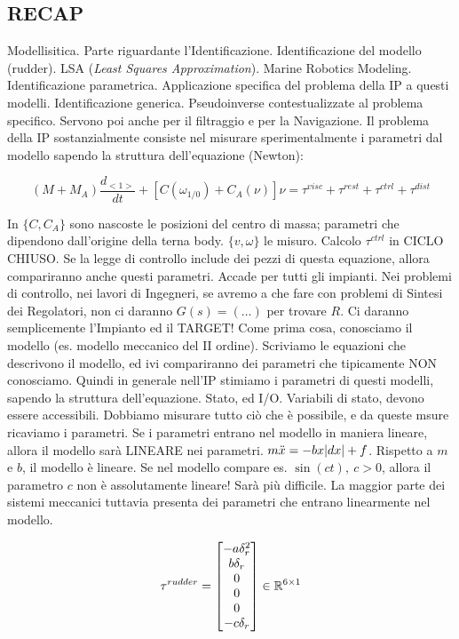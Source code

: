 \subsection{RECAP}

Modellisitica. Parte riguardante l'Identificazione. Identificazione del modello (rudder). LSA (\textit{Least Squares Approximation}). Marine Robotics Modeling. Identificazione parametrica. Applicazione specifica del problema della IP a questi modelli. Identificazione generica. Pseudoinverse contestualizzate al problema specifico. Servono poi anche per il filtraggio e per la Navigazione. Il problema della IP sostanzialmente consiste nel misurare sperimentalmente i parametri dal modello sapendo la struttura dell'equazione (Newton):

\[
	(M+M_A)\frac{d_{<1>}}{dt} + [C(\omega_{1/0}) + C_A(\nu)]\nu = \tau^{visc} + \tau^{rest} + \tau^{ctrl} + \tau^{dist}
\]

In $\{C,C_A\}$ sono nascoste le posizioni del centro di massa; parametri che dipendono dall'origine della terna body. $\{v,\omega\}$ le misuro. Calcolo $\tau^{ctrl}$ in CICLO CHIUSO. Se la legge di controllo include dei pezzi di questa equazione, allora compariranno anche questi parametri. Accade per tutti gli impianti. Nei problemi di controllo, nei lavori di Ingegneri, se avremo a che fare con problemi di Sintesi dei Regolatori, non ci daranno $G(s)=(\dots)$ per trovare $R$. Ci daranno semplicemente l'Impianto ed il TARGET! Come prima cosa, conosciamo il modello (es. modello meccanico del II ordine). Scriviamo le equazioni che descrivono il modello, ed ivi compariranno dei parametri che tipicamente NON conosciamo. Quindi in generale nell'IP stimiamo i parametri di questi modelli, sapendo la struttura dell'equazione. Stato, ed I/O. Variabili di stato, devono essere accessibili. Dobbiamo misurare tutto ciò che è possibile, e da queste msure ricaviamo i parametri. Se i parametri entrano nel modello in maniera lineare, allora il modello sarà LINEARE nei parametri. $m\ddot{x} = -bx\lvert dx\rvert+f$. Rispetto a $m$ e $b$, il modello è lineare. Se nel modello compare es. $\sin(ct),\ c>0$, allora il parametro $c$ non è assolutamente lineare! Sarà più difficile. La maggior parte dei sistemi meccanici tuttavia presenta dei parametri che entrano linearmente nel modello.

\[
	\tau^{rudder} = \begin{bmatrix}-a\delta_r^2\\b\delta_r\\0\\0\\0\\-c\delta_r\end{bmatrix}\in\mathbb{R}^{6\times 1}
\]

